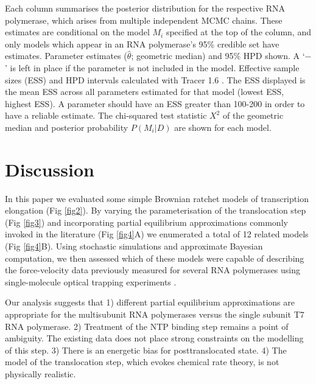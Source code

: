 \documentclass[10pt,letterpaper]{article}
\begin{document}
\begin{table}[!ht]
\begin{adjustwidth}{-2.25in}{0in}
{\begin{tabular}{|c|cc|cc|c|}
\end{tabular}
}
\begin{flushleft}  Each column summarises the posterior distribution for the respective RNA polymerase, which arises from multiple independent MCMC chains. 
These estimates are conditional on the model $M_i$ specified at the top of the column, and only models which appear in an RNA polymerase's 95\% credible set have estimates. 
Parameter estimates ($\hat{\theta}$; geometric median) and 95\% HPD shown. 
A `$-$' is left in place if the parameter is not included in the model. 
Effective sample sizes (ESS) and HPD intervals calculated with Tracer 1.6 \cite{rambaut2013tracer}. 
The ESS displayed is the mean ESS across all parameters estimated for that model (lowest ESS, highest ESS). A parameter should have an ESS greater than 100-200 in order to have a reliable estimate.  
The chi-squared test statistic $X^2$ of the geometric median and posterior probability $P(M_i|D)$ are shown for each model.
\end{flushleft}
\label{table1}
\end{adjustwidth}
\end{table}









\section*{Discussion}


In this paper we evaluated some simple Brownian ratchet models of transcription elongation (Fig \ref{fig2}). By varying the parameterisation of the translocation step  (Fig \ref{fig3}) and incorporating partial equilibrium approximations commonly invoked in the literature   (Fig \ref{fig4}A) we enumerated a total of 12 related models (Fig \ref{fig4}B). Using stochastic simulations and approximate Bayesian computation, we then assessed which of these models were capable of describing the force-velocity data previously measured for several RNA polymerases using single-molecule optical trapping experiments \cite{abbondanzieri2005direct, schweikhard2014transcription, thomen2008t7}.

Our analysis suggests that 1) different partial equilibrium approximations are appropriate for the multisubunit RNA polymerases versus the single subunit  T7 RNA polymerase. 2) Treatment of the NTP binding step remains a point of ambiguity. The existing data does not place strong constraints on the modelling of this step. 3) There is an energetic bias for posttranslocated state. 4) The model of the translocation step, which evokes chemical rate theory, is not physically realistic.
\end{document}
